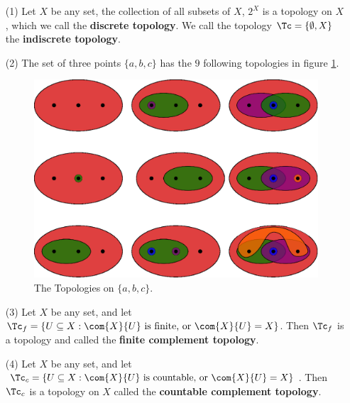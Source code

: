 \begin{example}
    \begin{enumerate}
        \item[(1)] Let $X$ be any set, the collection of all subsets of  $X$,  $2^X$ is a topology
            on $X$, which we call the \textbf{discrete topology}. We call the topology
            $\Tc=
            \{\emptyset, X\}$ the \textbf{indiscrete topology}.

        \item[(2)] The set of three points $\{a, b, c\}$ has the  $9$ following
            topologies
            in figure \ref{fig1.1}.
            \begin{figure}[h]
                \centering
                \includegraphics[scale = 0.5]{Figures/Chapter1/three_point_topology.eps}
                \caption{The Topologies on $\{a, b, c\}$.}
                \label{fig1.1}
            \end{figure}

        \item[(3)] Let $X$ be any set, and let  $\Tc_f=\{U \subseteq X: \com{X}{U}
                \text{ is finite, or } \com{X}{U}=X\}$. Then  $\Tc_f$ is a
                topology and called the \textbf{finite complement topology}.

        \item[(4)] Let $X$ be any set, and let  $\Tc_c=\{U \subseteq X: \com{X}{U}
                \text{ is countable, or } \com{X}{U}=X\}$. Then  $\Tc_c$ is a
                topology on $X$ called the \textbf{countable complement
                topology}.
    \end{enumerate}
\end{example}

